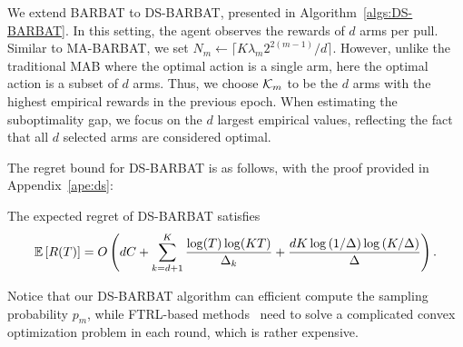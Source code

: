 
We extend BARBAT to DS-BARBAT, presented in Algorithm~\ref{algs:DS-BARBAT}. In this setting, the agent observes the rewards of $d$ arms per pull. Similar to MA-BARBAT, we set $N_m \leftarrow \lceil K \lambda_m 2^{2(m-1)} / d \rceil$. However, unlike the traditional MAB where the optimal action is a single arm, here the optimal action is a subset of $d$ arms. Thus, we choose ${\mathcal{K}}_m$ to be the $d$ arms with the highest empirical rewards in the previous epoch. When estimating the suboptimality gap, we focus on the $d$ largest empirical values, reflecting the fact that all $d$ selected arms are considered optimal.

The regret bound for DS-BARBAT is as follows, with the proof provided in Appendix~\ref{ape:ds}:
\begin{theorem}
\label{the:ds-erb}
The expected regret of DS-BARBAT satisfies
\[
{\mathbb{E}}\left[R(T)\right] = O\left(dC + \sum_{k=d+1}^{K}\frac{\log(T)\log(KT)}{\Delta_{k}} + \frac{dK\log\left(1/\Delta\right)\log\left(K/\Delta\right)}{\Delta}\right).
\]
\end{theorem}


    Notice that our DS-BARBAT algorithm can efficient compute the sampling probability $p_m$, while FTRL-based methods~\citep{wei2018more,zimmert2019beating,ito2021hybrid,tsuchiya2023further} need to solve a complicated convex optimization problem in each round, which is rather expensive.

